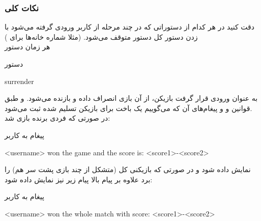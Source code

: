 \documentclass[]{article}
\begin{document}
\subsubsection*{{\titr نکات کلی}}
دقت کنید در هر کدام از دستوراتی که در چند مرحله از کاربر ورودی گرفته می‌شود 
با زدن دستور  کل دستور متوقف می‌شود. (مثلا شماره خانه‌ها برای 
)
\\
    هر زمان دستور 
\begin{mybox}[colback=yellow]{دستور}
	\begin{latin}	
	    surrender 	
	\end{latin}
\end{mybox}
به عنوان ورودی قرار گرفت بازیکن، از آن بازی انصراف داده و بازنده می‌شود. و 
طبق قوانین  و  و پیغام‌های آن که می‌گوییم یک باخت برای 
بازیکن 
تسلیم شده ثبت می‌شود.
\\
    در صورتی که فردی برنده بازی شد:
\begin{mybox}[colback=yellow]{پیغام به کاربر}
	\begin{latin}	
		<username> won the game and the score is:  <score1>-<score2>
	\end{latin}
\end{mybox}
نمایش داده شود و در صورتی که بازیکنی کل  (متشکل از چند بازی پشت سر 
هم) را برد علاوه بر پیام بالا پیام زیر نیز نمایش داده شود:
\begin{mybox}[colback=yellow]{پیغام به کاربر}
	\begin{latin}	
		<username> won the whole match with score: <score1>-<score2>
	\end{latin}
\end{mybox}
\end{document}
